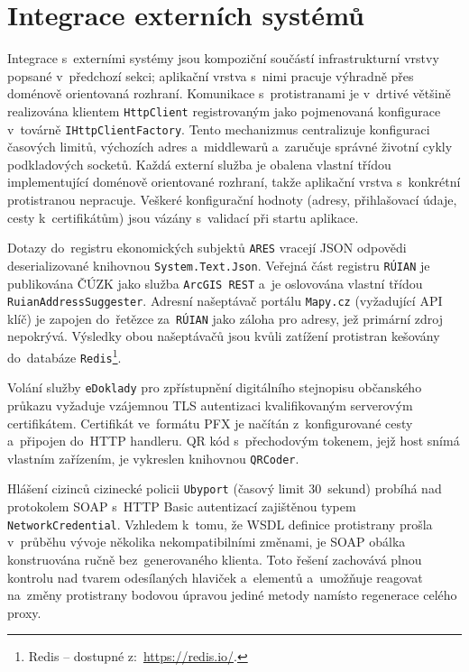 \section{Integrace externích systémů}
\label{sec:impl-external}
Integrace s~externími systémy jsou kompoziční součástí infrastrukturní vrstvy popsané v~předchozí sekci; aplikační vrstva s~nimi pracuje výhradně přes doménově orientovaná rozhraní.
Komunikace s~protistranami je v~drtivé většině realizována klientem \texttt{HttpClient} registrovaným jako pojmenovaná konfigurace v~továrně \texttt{IHttpClientFactory}.
Tento mechanizmus centralizuje konfiguraci časových limitů, výchozích adres a~middlewarů a~zaručuje správné životní cykly podkladových socketů.
Každá externí služba je obalena vlastní třídou implementující doménově orientované rozhraní, takže aplikační vrstva s~konkrétní protistranou nepracuje.
Veškeré konfigurační hodnoty (adresy, přihlašovací údaje, cesty k~certifikátům) jsou vázány s~validací při startu aplikace.

Dotazy do~registru ekonomických subjektů \texttt{ARES} vracejí JSON odpovědi deserializované knihovnou \texttt{System.Text.Json}.
Veřejná část registru \texttt{RÚIAN} je publikována ČÚZK jako služba \texttt{ArcGIS~REST} a~je oslovována vlastní třídou \texttt{RuianAddressSuggester}.
Adresní našeptávač portálu \texttt{Mapy.cz} (vyžadující API klíč) je zapojen do~řetězce za~\texttt{RÚIAN} jako záloha pro adresy, jež primární zdroj nepokrývá.
Výsledky obou našeptávačů jsou kvůli zatížení protistran kešovány do~databáze \texttt{Redis}\footnote{Redis -- dostupné z:~\url{https://redis.io/}.}.

Volání služby \texttt{eDoklady} pro zpřístupnění digitálního stejnopisu občanského průkazu vyžaduje vzájemnou TLS autentizaci kvalifikovaným serverovým certifikátem.
Certifikát ve~formátu PFX je načítán z~konfigurované cesty a~připojen do~HTTP handleru.
QR kód s~přechodovým tokenem, jejž host snímá vlastním zařízením, je vykreslen knihovnou \texttt{QRCoder}.

Hlášení cizinců cizinecké policii \texttt{Ubyport} (časový limit 30~sekund) probíhá nad protokolem SOAP s~HTTP Basic autentizací zajištěnou typem \texttt{NetworkCredential}.
Vzhledem k~tomu, že WSDL definice protistrany prošla v~průběhu vývoje několika nekompatibilními změnami, je SOAP obálka konstruována ručně bez~generovaného klienta.
Toto řešení zachovává plnou kontrolu nad tvarem odesílaných hlaviček a~elementů a~umožňuje reagovat na~změny protistrany bodovou úpravou jediné metody namísto regenerace celého proxy.

